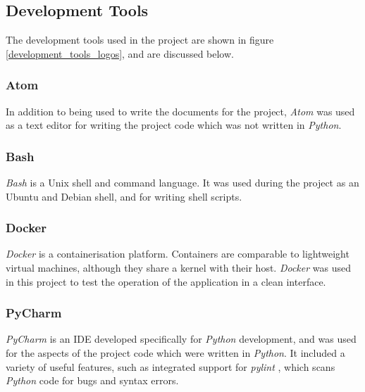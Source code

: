 \subsection{Development Tools}
The development tools used in the project are shown in figure \ref{development_tools_logos}, and are discussed below.

\subsubsection{Atom \cite{atom}}
In addition to being used to write the documents for the project, \textit{Atom} was used as a text editor for writing the project code which was not written in \textit{Python}.

\subsubsection{Bash \cite{bash}}
\textit{Bash} is a Unix shell and command language. It was used during the project as an Ubuntu and Debian shell, and for writing shell scripts.

\subsubsection{Docker \cite{docker}}
\textit{Docker} is a containerisation platform. Containers are comparable to lightweight virtual machines, although they share a kernel with their host. \textit{Docker} was used in this project to test the operation of the application in a clean interface.

\subsubsection{PyCharm \cite{pycharm}}
\textit{PyCharm} is an IDE developed specifically for \textit{Python} development, and was used for the aspects of the project code which were written in \textit{Python}. It included a variety of useful features, such as integrated support for \textit{pylint} \cite{pylint}, which scans \textit{Python} code for bugs and syntax errors.

